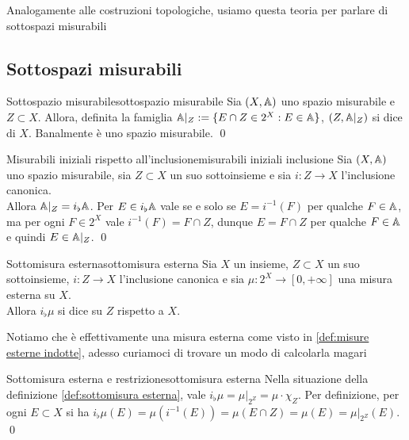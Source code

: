 \documentclass[openany]{book}
\begin{document}
Analogamente alle costruzioni topologiche, usiamo questa teoria per parlare di sottospazi misurabili

\subsection{Sottospazi misurabili}

\begin{definition}{Sottospazio misurabile}{sottospazio misurabile}
    Sia $(X,\mathbb{A})$ uno spazio misurabile e $Z\subset X$. Allora, definita la famiglia $\mathbb{A}|_Z := \{E\cap Z \in 2^X : E\in \mathbb{A}\}$, $(Z, \mathbb{A}|_Z)$ si dice  di $X$.
    \proof 
    Banalmente è uno spazio misurabile.
    \qed
\end{definition}

\begin{proposition}{Misurabili iniziali rispetto all'inclusione}{misurabili iniziali inclusione}
    Sia $(X,\mathbb{A})$ uno spazio misurabile, sia $Z\subset X$ un suo sottoinsieme e sia $i : Z \to X$ l'inclusione canonica.\\
    Allora $\mathbb{A}|_Z = i_\flat \mathbb{A}$.
    \proof
    Per $E \in i_\flat \mathbb{A}$ vale se e solo se $E = i^{-1}(F)$ per qualche $F \in \mathbb{A}$, ma per ogni $F \in 2^X$ vale $i^{-1}(F) = F \cap Z$, dunque $E = F\cap Z$ per qualche $F \in \mathbb{A}$ e quindi $E \in \mathbb{A}|_Z$.
    \qed
\end{proposition}

\begin{definition}{Sottomisura esterna}{sottomisura esterna}
    Sia $X$ un insieme, $Z\subset X$ un suo sottoinsieme, $i:Z\to X$ l'inclusione canonica e sia $\mu : 2^X \to [0,+\infty]$ una misura esterna su $X$.\\
    Allora $i_\flat \mu$ si dice  su $Z$ rispetto a $X$.
\end{definition}

Notiamo che è effettivamente una misura esterna come visto in \ref{def:misure esterne indotte}, adesso curiamoci di trovare un modo di calcolarla magari

\begin{proposition}{Sottomisura esterna e restrizione}{sottomisura esterna}
    Nella situazione della definizione \ref{def:sottomisura esterna}, vale $i_\flat \mu = \mu|_{2^Z} = \mu \cdot \chi_Z$.
    \proof
    Per definizione, per ogni $E\subset X$ si ha $i_\flat \mu(E) = \mu(i^{-1}(E)) = \mu(E\cap Z) = \mu(E) = \mu|_{2^Z}(E)$.
    \qed
\end{proposition}
\end{document}
